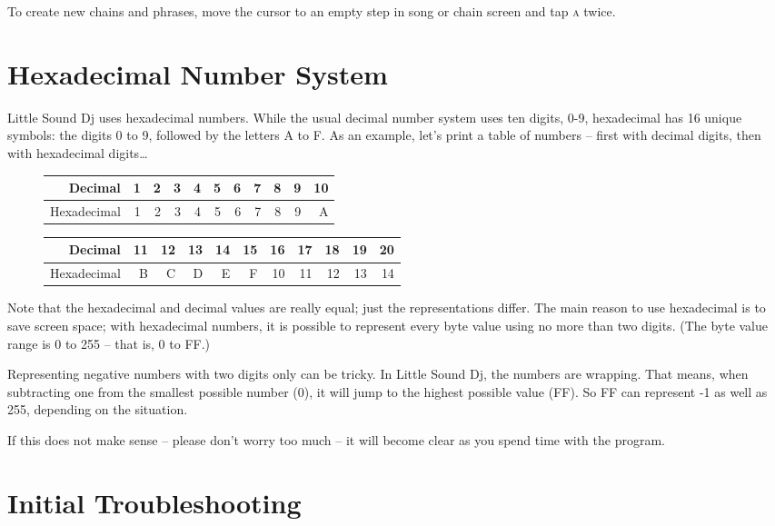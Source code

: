 To create new chains and phrases, move the cursor to an empty step in song or chain screen and tap \textsc{a} twice.

\section{Hexadecimal Number System}

Little Sound Dj uses hexadecimal numbers. While the usual decimal number system uses ten digits, 0-9, hexadecimal has 16 unique symbols: the digits 0 to 9, followed by the letters A to F.
As an example, let's print a table of numbers -- first with decimal digits, then with
hexadecimal digits\ldots

\begin{figure}[hbtp]
\centering

\begin{tabular}{r|r|r|r|r|r|r|r|r|r|r}
 Decimal & 1 & 2 & 3 & 4 & 5 & 6 & 7 & 8 & 9 & 10 \\
\hline
 Hexadecimal & 1 & 2 & 3 & 4 & 5 & 6 & 7 & 8 & 9 & A \\
\end{tabular}

\begin{tabular}{r|r|r|r|r|r|r|r|r|r|r}
 Decimal & 11 & 12 & 13 & 14 & 15 & 16 & 17 & 18 & 19 & 20 \\
\hline
 Hexadecimal & B & C & D & E & F & 10 & 11 & 12 & 13 & 14  \\
\end{tabular}

\end{figure}

Note that the hexadecimal and decimal values are really equal; just the representations differ.
The main reason to use hexadecimal is to save screen space; with hexadecimal
numbers, it is possible to represent every byte value using no more than two digits. (The
byte value range is 0 to 255 -- that is, 0 to FF.)

Representing negative numbers with two digits only can be tricky. In Little Sound Dj,
the numbers are wrapping. That means, when subtracting one from the smallest possible
number (0), it will jump to the highest possible value (FF). So FF can represent -1 as well as 255, depending on the situation.

If this does not make sense -- please don't worry too much -- it will become clear as you spend time with the program.

\section{Initial Troubleshooting}

